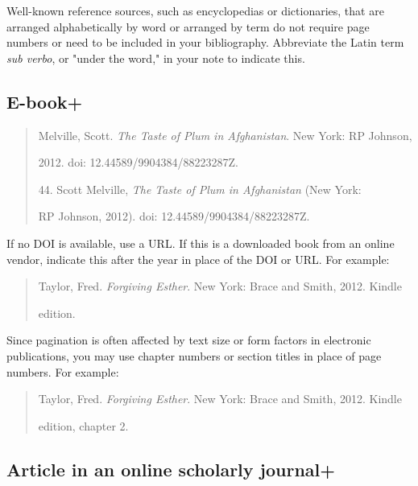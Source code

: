  Well-known reference sources, such as encyclopedias or dictionaries, that are arranged alphabetically
by word or arranged by term do not require page numbers or need to be included in your bibliography. Abbreviate the Latin term \emph{sub verbo}, or "under the word," in your note to indicate this.

\subsection{E-book+}
\begin{quote}

Melville, Scott. \emph{The Taste of Plum in Afghanistan}. New York: RP Johnson, 

\hspace{.4in}2012. doi: 12.44589/9904384/88223287Z.

\medskip

\hspace{.4in}44. Scott Melville, \emph{The Taste of Plum in Afghanistan} (New York:

 RP Johnson, 2012). doi: 12.44589/9904384/88223287Z.
\end{quote}

 If no DOI is available, use a URL. If this is a downloaded book from an online vendor, indicate this 
after the year in place of the DOI or URL. For example:

\begin{quote}
Taylor, Fred. \emph{Forgiving Esther}. New York: Brace and Smith, 2012. Kindle 

\hspace{.4in}edition.

\end{quote}

 Since pagination is often affected by text size or form factors in electronic publications, you may 
use chapter numbers or section titles in place of page numbers. For example:

\begin{quote}
Taylor, Fred. \emph{Forgiving Esther}. New York: Brace and Smith, 2012. Kindle 

\hspace{.4in}edition, chapter 2.

\end{quote}


\subsection{Article in an online scholarly journal+}

